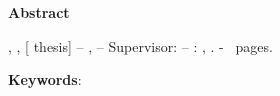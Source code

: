 \thispagestyle{empty} %

\noindent\LARGE \textbf{Abstract}\\

\normalsize

\vspace{0.5cm}

{
	\setlength{\parindent}{0pt}
	
	\authorname{},  
	\thesistitle{},
	\ifdefempty{\thesissubtitle}{}{%
		\thesissubtitle{},
	}
	[\typeofwork{} thesis] –  
	\universityname{},  
	\facultyname{} –   
	Supervisor: \supervisorname{} –  
	\cityname{}: \facultyabbreviation{} \universityabbreviation{},
	\currentyear{}. -
	\pageref{LastPage}~pages.
}

\vspace{0.5cm}

\abstractmy{}

\vspace{0.5cm}

{
	\setlength{\parindent}{0pt} 
	\textbf{Keywords}: \keywordsmy{}
}
\vspace{0.5cm}

\newpage